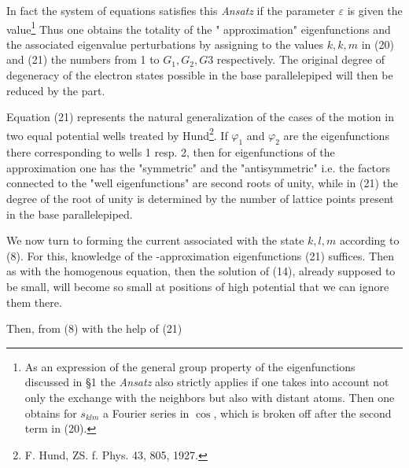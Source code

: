 \begin{paper}{1}
In fact the system of equations satisfies this \textit{Ansatz} if the parameter $\varepsilon$ is given the value\footnote{As an expression of the general group property of the eigenfunctions discussed in \S1 the \textit{Ansatz} also strictly applies if one takes into account not only the exchange with the neighbors but also with distant atoms. Then one obtains for $s_{klm}$ a Fourier series in $\cos$, which is broken off after the second term in (20).}
Thus one obtains the totality of the " approximation" eigenfunctions
and the associated eigenvalue perturbations by assigning to the values $k,k,m$ in (20) and (21) the numbers from 1 to $G_1,G_2,G3$ respectively. The original degree of degeneracy of the electron states possible in the base parallelepiped will then be reduced by the  part.

Equation (21) represents the natural generalization of the cases of the motion in two equal potential wells treated by Hund\footnote{F. Hund, ZS. f. Phys. 43, 805, 1927.}. If $\varphi_1$ and $\varphi_2$ are the eigenfunctions there corresponding to wells 1 resp. 2, then for eigenfunctions of the  approximation one has the "symmetric"
and the "antisymmetric"
i.e. the factors connected to the "well eigenfunctions" are second roots of unity, while in (21) the degree of the root of unity is determined by the number of lattice points present in the base parallelepiped. 

We now turn to forming the current associated with the state $k,l,m$ according to (8). For this, knowledge of the -approximation eigenfunctions (21) suffices. Then as with the homogenous equation, then the solution of (14), already supposed to be small, will become so small at positions of high potential that we can ignore them there.

Then, from (8) with the help of (21)


\end{paper}
